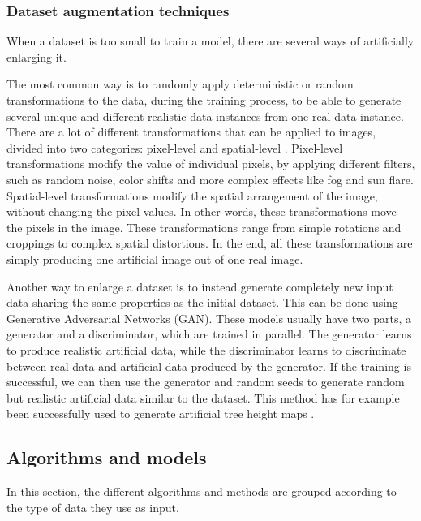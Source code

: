 \documentclass[
  letterpaper,
  DIV=11,
  numbers=noendperiod]{scrartcl}
\begin{document}
\subsubsection{Dataset augmentation
techniques}\label{sec-sota-dataset-augment}

When a dataset is too small to train a model, there are several ways of
artificially enlarging it.

The most common way is to randomly apply deterministic or random
transformations to the data, during the training process, to be able to
generate several unique and different realistic data instances from one
real data instance. There are a lot of different transformations that
can be applied to images, divided into two categories: pixel-level and
spatial-level \autocite{albumentations}. Pixel-level transformations
modify the value of individual pixels, by applying different filters,
such as random noise, color shifts and more complex effects like fog and
sun flare. Spatial-level transformations modify the spatial arrangement
of the image, without changing the pixel values. In other words, these
transformations move the pixels in the image. These transformations
range from simple rotations and croppings to complex spatial
distortions. In the end, all these transformations are simply producing
one artificial image out of one real image.

Another way to enlarge a dataset is to instead generate completely new
input data sharing the same properties as the initial dataset. This can
be done using Generative Adversarial Networks (GAN). These models
usually have two parts, a generator and a discriminator, which are
trained in parallel. The generator learns to produce realistic
artificial data, while the discriminator learns to discriminate between
real data and artificial data produced by the generator. If the training
is successful, we can then use the generator and random seeds to
generate random but realistic artificial data similar to the dataset.
This method has for example been successfully used to generate
artificial tree height maps \autocite{gan_data_augment}.

\subsection{Algorithms and models}\label{algorithms-and-models}

In this section, the different algorithms and methods are grouped
according to the type of data they use as input.
\end{document}
